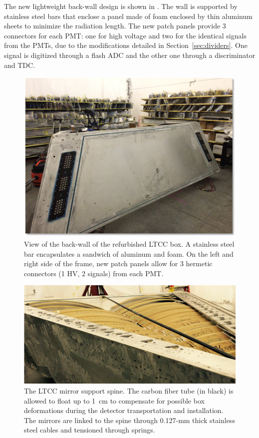 The new lightweight back-wall design is shown in . The wall is supported by stainless steel bars that
enclose a panel made of foam enclosed by thin aluminum sheets to minimize the radiation length. The new patch
panels provide 3 connectors for each PMT: one for high voltage and two for the identical signals from the PMTs, due
to the modifications detailed in Section~\ref{sec:dividers}. One signal is digitized through a flash ADC and the other
one through a discriminator and TDC.

\begin{figure}[h]
	\centering
	\includegraphics[width=0.99\columnwidth,keepaspectratio]{img/backWall.png}
	\caption{View of the back-wall of the refurbished LTCC box. A stainless steel bar encapsulates a sandwich of
          aluminum and foam. On the left and right side of the frame, new patch panels allow for 3 hermetic connectors
          (1 HV, 2 signals) from each PMT.}
	\label{fig:backWall}
\end{figure}

\begin{figure}[b]
	\centering
	\includegraphics[width=1.0\columnwidth,keepaspectratio]{img/spine.png}
	\caption{The LTCC mirror support spine. The carbon fiber tube (in black) is allowed to float up to 1~cm to
          compensate for possible box deformations during the detector transportation and installation. The mirrors
          are linked to the spine through 0.127-mm thick stainless steel cables and tensioned through springs.}
	\label{fig:spine}
\end{figure}

